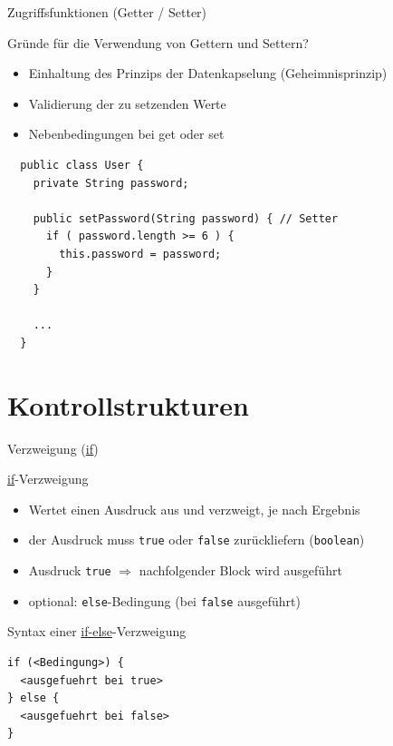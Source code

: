\documentclass[18pt]{beamer}
\begin{document}
\begin{frame}[fragile]{Zugriffsfunktionen (Getter / Setter)}
	\begin{block}{Gründe für die Verwendung von Gettern und Settern?}
    \begin{itemize}
      \item Einhaltung des Prinzips der Datenkapselung (Geheimnisprinzip)
      \pause
      \item Validierung der zu setzenden Werte
      \pause
      \item Nebenbedingungen bei get oder set
    \end{itemize}
    \end{block}
    \pause
    \begin{lstlisting}
  public class User {   
    private String password;
    
    public setPassword(String password) { // Setter
      if ( password.length >= 6 ) {
        this.password = password;
      }
    }
    
    ...
  }\end{lstlisting}
\end{frame}


\section{Kontrollstrukturen}
\begin{frame}[fragile]{Verzweigung (\url{if})}
  \begin{block}{\url{if}-Verzweigung}
    \begin{itemize}
      \item Wertet einen Ausdruck aus und verzweigt, je nach Ergebnis
      \item der Ausdruck muss \lstinline$true$ oder \lstinline$false$ zurückliefern (\lstinline$boolean$)
      \item Ausdruck \lstinline$true$ $\Rightarrow$ nachfolgender Block wird ausgeführt
      \item optional: \lstinline$else$-Bedingung (bei \lstinline$false$ ausgeführt)
    \end{itemize}
  \end{block}
  Syntax einer \url{if-else}-Verzweigung
  \begin{lstlisting}
if (<Bedingung>) {
  <ausgefuehrt bei true>
} else {
  <ausgefuehrt bei false>
}
\end{lstlisting}   
\end{frame}
\end{document}
